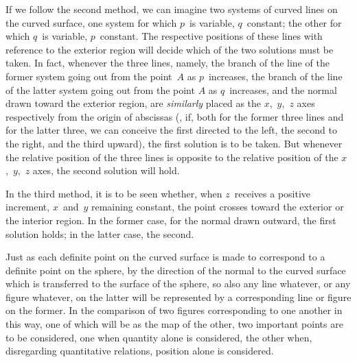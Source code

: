 If we follow the second method, we can imagine two systems of curved lines on the
curved surface, one system for which $p$~is variable, $q$~constant; the other for which $q$~is
variable, $p$~constant. The respective positions of these lines with reference to the exterior
region will decide which of the two solutions must be taken. In fact, whenever
the three lines, namely, the branch of the line of the former system going out from the
point~$A$ as $p$~increases, the branch of the line of the latter system going out from the point
$A$ as $q$~increases, and the normal drawn toward the exterior region, are \emph{similarly} placed as
the $x$,~$y$,~$z$ axes respectively from the origin of abscissas (\eg, if, both for the former
three lines and for the latter three, we can conceive the first directed to the left, the
second to the right, and the third upward), the first solution is to be taken. But whenever
the relative position of the three lines is opposite to the relative position of the
$x$,~$y$,~$z$ axes, the second solution will hold.

In the third method, it is to be seen whether, when $z$~receives a positive increment, $x$~and~$y$
remaining constant, the point crosses toward the exterior or the interior region.
In the former case, for the normal drawn outward, the first solution holds; in the latter
case, the second.



Just as each definite point on the curved surface is made to correspond to a definite
point on the sphere, by the direction of the normal to the curved surface which is transferred
to the surface of the sphere, so also any line whatever, or any figure whatever, on
the latter will be represented by a corresponding line or figure on the former. In the
comparison of two figures corresponding to one another in this way, one of which will be
as the map of the other, two important points are to be considered, one when quantity
alone is considered, the other when, disregarding quantitative relations, position alone
is considered.

